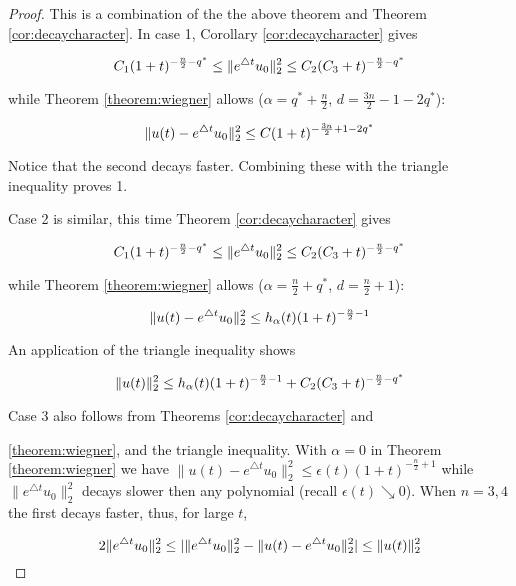 \documentclass{amsart}
\numberwithin{Theorem}{section}
\numberwithin{equation}{section}
\theoremstyle{definition}
\theoremstyle{remark}
\begin{document}
\begin{proof}

This is a combination of the the above theorem and Theorem \ref{cor:decaycharacter}.  In case 1, Corollary \ref{cor:decaycharacter} gives

\begin{equation}
C_1(1+t)^{-\frac{n}{2}-q^*}\leq \|e^{\triangle t}u_0\|_2^2\leq C_2(C_3+t)^{-\frac{n}{2}-q^*}\notag
\end{equation}

while Theorem \ref{theorem:wiegner} allows ($\alpha = q^*+\frac{n}{2}$, $d=\frac{3n}{2}-1-2q^*$):

\begin{equation}
\|u(t)-e^{\triangle t}u_0\|_2^2\leq C(1+t)^{-\frac{3n}{2}+1-2q^*}\notag
\end{equation}

Notice that the second decays faster.  Combining these with the triangle inequality proves 1.

Case 2 is similar, this time Theorem \ref{cor:decaycharacter} gives

\begin{equation}
C_1(1+t)^{-\frac{n}{2}-q^*}\leq \|e^{\triangle t}u_0\|_2^2\leq C_2(C_3+t)^{-\frac{n}{2}-q^*}\notag
\end{equation}

while Theorem \ref{theorem:wiegner} allows ($\alpha=\frac{n}{2}+q^*$, $d=\frac{n}{2}+1$):

\begin{equation}
\|u(t)-e^{\triangle t}u_0\|_2^2\leq h_\alpha(t)(1+t)^{-\frac{n}{2}-1}\notag
\end{equation}

An application of the triangle inequality shows

\begin{equation}\notag
\|u(t)\|_2^2 \leq h_\alpha(t)(1+t)^{-\frac{n}{2}-1}+C_2(C_3+t)^{-\frac{n}{2}-q^*}
\end{equation}

Case 3 also follows from Theorems \ref{cor:decaycharacter} and

\ref{theorem:wiegner}, and the triangle inequality.  With $\alpha
=0$ in Theorem \ref{theorem:wiegner} we have $\|u(t)-e^{\triangle
t}u_0\|_2^2\leq \epsilon(t)(1+t)^{-\frac{n}{2}+1}$ while
$\|e^{\triangle t}u_0\|_2^2$ decays slower then any polynomial
(recall $\epsilon(t)\searrow 0$). When $n=3,4$ the first decays
faster, thus, for large $t$,

\begin{equation}\notag
2\|e^{\triangle t}u_0\|_2^2 \leq |\|e^{\triangle t}u_0\|_2^2-\|u(t)-e^{\triangle t}u_0\|^2_2| \leq \|u(t)\|_2^2
\end{equation}

\end{proof}




\end{document}
